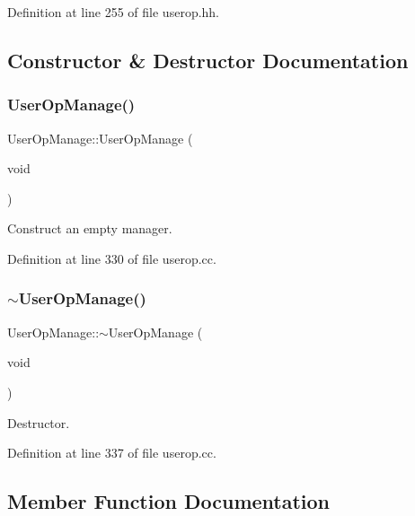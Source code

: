 Definition at line 255 of file userop.\+hh.



\subsection{Constructor \& Destructor Documentation}
\mbox{\label{class_user_op_manage_a098ed23d045ef596ee62529d1966a888}} 
\subsubsection{\texorpdfstring{UserOpManage()}{UserOpManage()}}
{\footnotesize\ttfamily User\+Op\+Manage\+::\+User\+Op\+Manage (\begin{DoxyParamCaption}\item[{void}]{ }\end{DoxyParamCaption})}



Construct an empty manager. 



Definition at line 330 of file userop.\+cc.

\mbox{\label{class_user_op_manage_ac1cf153da5ddb19471541660c8889b8f}} 
\subsubsection{\texorpdfstring{$\sim$UserOpManage()}{~UserOpManage()}}
{\footnotesize\ttfamily User\+Op\+Manage\+::$\sim$\+User\+Op\+Manage (\begin{DoxyParamCaption}\item[{void}]{ }\end{DoxyParamCaption})}



Destructor. 



Definition at line 337 of file userop.\+cc.



\subsection{Member Function Documentation}
\mbox{\label{class_user_op_manage_a20d645319fc3912640bec7113c11818d}} 
